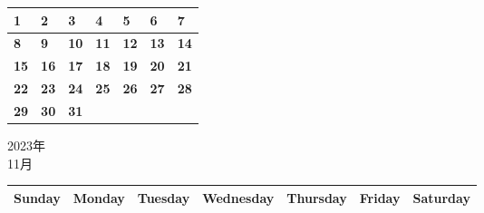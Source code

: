 \documentclass[a4paper,landscape]{jsarticle}
\newcommand{\dig}{\hspace{29mm}}
\newcommand{\tdig}{\hspace{27mm}}
\newcommand{\LBF}{\LARGE\textbf}
\begin{document}
\begingroup
\renewcommand{\arraystretch}{4}
\begin{tabular}{|p{32mm}|p{32mm}|p{32mm}|p{32mm}|p{32mm}|p{32mm}|p{32mm}|}
\hline
\raisebox{30pt} {\dig\LBF{1}}&\raisebox{30pt} {\dig\LBF{2}}&\raisebox{30pt} {\dig\LBF{3}}&\raisebox{30pt} {\dig\LBF{4}}&\raisebox{30pt} {\dig\LBF{5}}&\raisebox{30pt} {\dig\LBF{6}}&\raisebox{30pt} {\dig\LBF{7}}\\
\hline
\raisebox{30pt} {\dig\LBF{8}}&\raisebox{30pt} {\dig\LBF{9}}&\raisebox{30pt} {\tdig\LBF{10}}&\raisebox{30pt} {\tdig\LBF{11}}&\raisebox{30pt} {\tdig\LBF{12}}&\raisebox{30pt} {\tdig\LBF{13}}&\raisebox{30pt} {\tdig\LBF{14}}\\
\hline
\raisebox{30pt} {\tdig\LBF{15}}&\raisebox{30pt} {\tdig\LBF{16}}&\raisebox{30pt} {\tdig\LBF{17}}&\raisebox{30pt} {\tdig\LBF{18}}&\raisebox{30pt} {\tdig\LBF{19}}&\raisebox{30pt} {\tdig\LBF{20}}&\raisebox{30pt} {\tdig\LBF{21}}\\
\hline
\raisebox{30pt} {\tdig\LBF{22}}&\raisebox{30pt} {\tdig\LBF{23}}&\raisebox{30pt} {\tdig\LBF{24}}&\raisebox{30pt} {\tdig\LBF{25}}&\raisebox{30pt} {\tdig\LBF{26}}&\raisebox{30pt} {\tdig\LBF{27}}&\raisebox{30pt} {\tdig\LBF{28}}\\
\hline
\raisebox{30pt} {\tdig\LBF{29}}&\raisebox{30pt} {\tdig\LBF{30}}&\raisebox{30pt} {\tdig\LBF{31}}&&&&\\
\hline
\end{tabular}
\endgroup
\newpage\begin{center}
	\LARGE 2023年\\
	\LARGE 11月
\end{center}

\begingroup
\renewcommand{\arraystretch}{1.4}
\begin{tabular}{|>{\centering\arraybackslash}p{32mm}|>{\centering\arraybackslash}p{32mm}|>{\centering\arraybackslash}p{32mm}|>{\centering\arraybackslash}p{32mm}|>{\centering\arraybackslash}p{32mm}|>{\centering\arraybackslash}p{32mm}|>{\centering\arraybackslash}p{32mm}|}
\hline
\large Sunday&\large Monday &\large Tuesday&\large Wednesday&\large Thursday&\large Friday&\large Saturday\\
\hline
\end{tabular}
\endgroup
\end{document}
